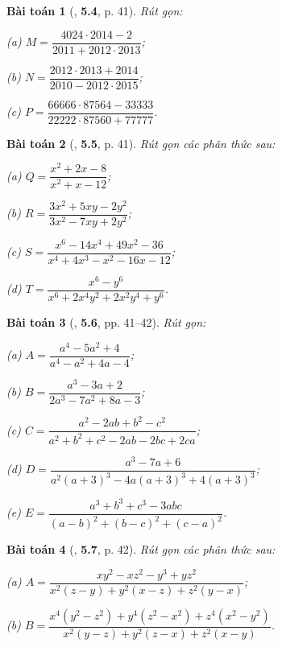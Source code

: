 \documentclass{article}
\numberwithin{equation}{section}
\newtheorem{baitoan}{Bài toán}[section]
\begin{document}
\begin{baitoan}[\cite{Binh_Nam_Ngoc_Son_Toan_8_Dai_So}, \textbf{5.4}, p. 41]
	Rút gọn:
	\begin{enumerate*}
		\item[(a)] $M = \dfrac{4024\cdot 2014 - 2}{2011 + 2012\cdot 2013}$;
		\item[(b)] $N = \dfrac{2012\cdot 2013 + 2014}{2010 - 2012\cdot 2015}$;
		\item[(c)] $P = \dfrac{66666\cdot 87564 - 33333}{22222\cdot 87560 + 77777}$.
	\end{enumerate*}
\end{baitoan}

\begin{baitoan}[\cite{Binh_Nam_Ngoc_Son_Toan_8_Dai_So}, \textbf{5.5}, p. 41]
	Rút gọn các phân thức sau:
	\begin{enumerate*}
		\item[(a)] $Q = \dfrac{x^2 + 2x - 8}{x^2 + x - 12}$;
		\item[(b)] $R = \dfrac{3x^2 + 5xy - 2y^2}{3x^2 - 7xy + 2y^2}$;
		\item[(c)] $S = \dfrac{x^6 - 14x^4 + 49x^2 - 36}{x^4 + 4x^3 - x^2 - 16x - 12}$;
		\item[(d)] $T = \dfrac{x^6 - y^6}{x^6 + 2x^4y^2 + 2x^2y^4 + y^6}$.
	\end{enumerate*}
\end{baitoan}

\begin{baitoan}[\cite{Binh_Nam_Ngoc_Son_Toan_8_Dai_So}, \textbf{5.6}, pp. 41--42]
	Rút gọn:
	\begin{enumerate*}
		\item[(a)] $A = \dfrac{a^4 - 5a^2 + 4}{a^4 - a^2 + 4a - 4}$;
		\item[(b)] $B = \dfrac{a^3 - 3a + 2}{2a^3 - 7a^2 + 8a - 3}$;
		\item[(c)] $C = \dfrac{a^2 - 2ab + b^2 - c^2}{a^2 + b^2 + c^2 - 2ab - 2bc + 2ca}$;
		\item[(d)] $D = \dfrac{a^3 - 7a + 6}{a^2(a + 3)^3 - 4a(a + 3)^3 + 4(a + 3)^3}$;
		\item[(e)] $E = \dfrac{a^3 + b^3 + c^3 - 3abc}{(a - b)^2 + (b - c)^2 + (c - a)^2}$.
	\end{enumerate*}
\end{baitoan}

\begin{baitoan}[\cite{Binh_Nam_Ngoc_Son_Toan_8_Dai_So}, \textbf{5.7}, p. 42]
	Rút gọn các phân thức sau:
	\begin{enumerate*}
		\item[(a)] $A = \dfrac{xy^2 - xz^2 - y^3 + yz^2}{x^2(z - y) + y^2(x - z) + z^2(y - x)}$;
		\item[(b)] $B = \dfrac{x^4(y^2 - z^2) + y^4(z^2 - x^2) + z^4(x^2 - y^2)}{x^2(y - z) + y^2(z - x) + z^2(x - y)}$.
	\end{enumerate*}
\end{baitoan}
\end{document}
